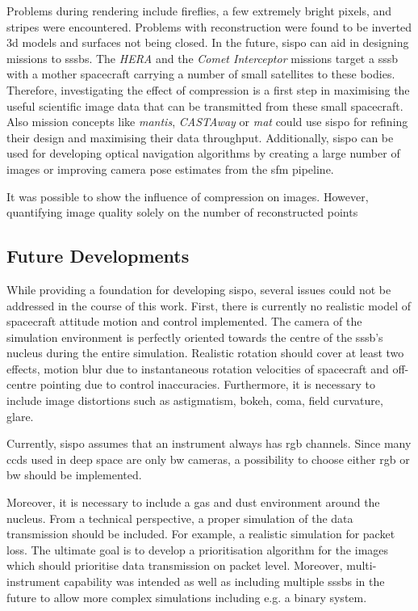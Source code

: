 Problems during rendering include fireflies, a few extremely bright pixels, and stripes were encountered.
Problems with reconstruction were found to be inverted \gls{3d} models and surfaces not being closed.
In the future, \gls{sispo} can aid in designing missions to \glspl{sssb}. The \textit{HERA} and the \textit{Comet Interceptor} missions target a \gls{sssb} with a mother spacecraft carrying a number of small satellites to these bodies. Therefore, investigating the effect of compression is a first step in maximising the useful scientific image data that can be transmitted from these small spacecraft. Also mission concepts like \textit{\gls{mantis}}, \textit{CASTAway} or \textit{\gls{mat}} could use \gls{sispo} for refining their design and maximising their data throughput. Additionally, \gls{sispo} can be used for developing optical navigation algorithms by creating a large number of images or improving camera pose estimates from the \gls{sfm} pipeline.

It was possible to show the influence of compression on images. However, quantifying image quality solely on the number of reconstructed points

\subsection{Future Developments}
While providing a foundation for developing \gls{sispo}, several issues could not be addressed in the course of this work.
First, there is currently no realistic model of spacecraft attitude motion and control implemented. The camera of the simulation environment is perfectly oriented towards the centre of the \gls{sssb}'s nucleus during the entire simulation. Realistic rotation should cover at least two effects, motion blur due to instantaneous rotation velocities of spacecraft and off-centre pointing due to control inaccuracies. Furthermore, it is necessary to include  image distortions such as astigmatism, bokeh, coma, field curvature, glare.

Currently, \gls{sispo} assumes that an instrument always has \gls{rgb} channels. Since many \gls{ccd}s used in deep space are only \gls{bw} cameras, a possibility to choose either \gls{rgb} or \gls{bw} should be implemented.

Moreover, it is necessary to include a gas and dust environment around the nucleus. From a technical perspective, a proper simulation of the data transmission should be included. For example, a realistic simulation for packet loss. The ultimate goal is to develop a prioritisation algorithm for the images which should prioritise data transmission on packet level.
Moreover, multi-instrument capability was intended as well as including multiple \gls{sssb}s in the future to allow more complex simulations including e.g. a binary system.

